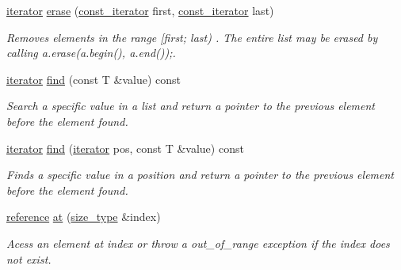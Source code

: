 \begin{DoxyCompactItemize}
\mbox{\label{classls_1_1list_abcac4200cf9fb2a3bdbbc8e546bc1c3b}} 
\hyperlink{classls_1_1list_af036cf72da26107a5084c1e4b45b9cb7}{iterator} \hyperlink{classls_1_1list_abcac4200cf9fb2a3bdbbc8e546bc1c3b}{erase} (\hyperlink{classls_1_1list_ad543276e86075caadf97ae64f2fc7cfc}{const\+\_\+iterator} first, \hyperlink{classls_1_1list_ad543276e86075caadf97ae64f2fc7cfc}{const\+\_\+iterator} last)
\begin{DoxyCompactList}\small\item\em Removes elements in the range \mbox{[}first; last) . The entire list may be erased by calling a.\+erase(a.\+begin(), a.\+end());. \end{DoxyCompactList}\item 
\mbox{\label{classls_1_1list_ae666f1d96561501b636670f326715271}} 
\hyperlink{classls_1_1list_af036cf72da26107a5084c1e4b45b9cb7}{iterator} \hyperlink{classls_1_1list_ae666f1d96561501b636670f326715271}{find} (const T \&value) const
\begin{DoxyCompactList}\small\item\em Search a specific value in a list and return a pointer to the previous element before the element found. \end{DoxyCompactList}\item 
\mbox{\label{classls_1_1list_a8e97b239d18147a8cba5862dcead7e1f}} 
\hyperlink{classls_1_1list_af036cf72da26107a5084c1e4b45b9cb7}{iterator} \hyperlink{classls_1_1list_a8e97b239d18147a8cba5862dcead7e1f}{find} (\hyperlink{classls_1_1list_af036cf72da26107a5084c1e4b45b9cb7}{iterator} pos, const T \&value) const
\begin{DoxyCompactList}\small\item\em Finds a specific value in a position and return a pointer to the previous element before the element found. \end{DoxyCompactList}\item 
\mbox{\label{classls_1_1list_abacebefd66b10fa5c24334368471023d}} 
\hyperlink{classls_1_1list_afb0f652e0362bc8c3e82c16efe795bf3}{reference} \hyperlink{classls_1_1list_abacebefd66b10fa5c24334368471023d}{at} (\hyperlink{classls_1_1list_a91bb77719712ad6127f0bdf97ed5bd64}{size\+\_\+type} \&index)
\begin{DoxyCompactList}\small\item\em Acess an element at index or throw a out\+\_\+of\+\_\+range exception if the index does not exist. \end{DoxyCompactList}\end{DoxyCompactItemize}
